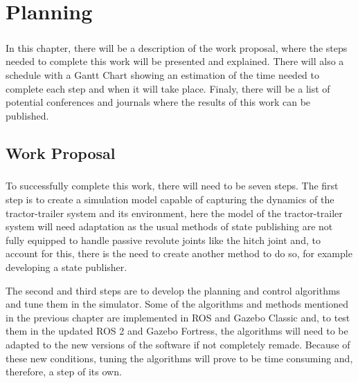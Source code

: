 
%

\chapter{Planning}
\label{cha:planning}
\paragraph{}In this chapter, there will be a description of the work proposal, where the steps needed to complete 
this work will be presented and explained. There will also a schedule with a Gantt Chart showing an estimation of 
the time needed to complete each step and when it will take place. Finaly, there will be a list of potential conferences 
and journals where the results of this work can be published.
\section{Work Proposal}
\label{sec:workproposal}
\paragraph{}To successfully complete this work, there will need to be seven steps. The first step is to create a
simulation model capable of capturing the dynamics of the tractor-trailer system and its environment, here the model of the 
tractor-trailer system will need adaptation as the usual methods of state publishing are not fully equipped to handle passive revolute joints 
like the hitch joint and, to account for this, there is the need to create another method to do so, for example developing a state 
publisher.


The second and third steps are to develop the planning and control algorithms and tune them in the simulator. Some of the 
algorithms and methods mentioned in the previous chapter are implemented in ROS and Gazebo Classic and, to test them in the 
updated ROS 2 and Gazebo Fortress, the algorithms will need to be adapted to the new versions of the software if not completely 
remade. Because of these new conditions, tuning the algorithms will prove to be time consuming and, therefore, a step of 
its own.

